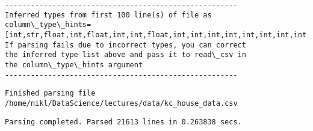 \documentclass[11pt]{article}
\begin{document}
    
    \begin{Verbatim}[commandchars=\\\{\}]
------------------------------------------------------
Inferred types from first 100 line(s) of file as 
column\_type\_hints=[int,str,float,int,float,int,int,float,int,int,int,int,int,int,int,int,int,float,float,int,int]
If parsing fails due to incorrect types, you can correct
the inferred type list above and pass it to read\_csv in
the column\_type\_hints argument
------------------------------------------------------

    \end{Verbatim}

    
    \begin{verbatim}
Finished parsing file /home/nikl/DataScience/lectures/data/kc_house_data.csv
    \end{verbatim}

    
    
    \begin{verbatim}
Parsing completed. Parsed 21613 lines in 0.263838 secs.
    \end{verbatim}
\end{document}
